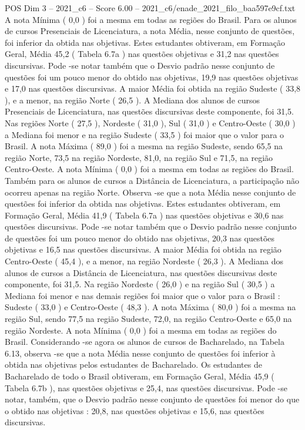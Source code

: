\begin{textsample}{POS Dim 3 – 2021\_c6 – Score 6.00 – 2021\_c6/enade\_2021\_filo\_baa597e9cf.txt}
A nota Mínima ( 0,0 ) foi a mesma em todas as regiões do Brasil.
Para os alunos de cursos Presenciais de Licenciatura, a nota Média, nesse conjunto de questões, foi inferior da obtida nas objetivas.
Estes estudantes obtiveram, em Formação Geral, Média 45,2 ( Tabela 6.7a ) nas questões objetivas e 31,2 nas questões discursivas.
Pode -se notar também que o Desvio padrão nesse conjunto de questões foi um pouco menor do obtido nas objetivas, 19,9 nas questões objetivas e 17,0 nas questões discursivas.
A maior Média foi obtida na região Sudeste ( 33,8 ), e a menor, na região Norte ( 26,5 ).
A Mediana dos alunos de cursos Presenciais de Licenciatura, nas questões discursivas deste componente, foi 31,5.
Nas regiões Norte ( 27,5 ), Nordeste ( 31,0 ), Sul ( 31,0 ) e Centro-Oeste ( 30,0 ) a Mediana foi menor e na região Sudeste ( 33,5 ) foi maior que o valor para o Brasil.
A nota Máxima ( 89,0 ) foi a mesma na região Sudeste, sendo 65,5 na região Norte, 73,5 na região Nordeste, 81,0, na região Sul e 71,5, na região Centro-Oeste.
A nota Mínima ( 0,0 ) foi a mesma em todas as regiões do Brasil.
Também para os alunos de cursos a Distância de Licenciatura, a participação não ocorreu apenas na região Norte.
Observa -se que a nota Média nesse conjunto de questões foi inferior da obtida nas objetivas.
Estes estudantes obtiveram, em Formação Geral, Média 41,9 ( Tabela 6.7a ) nas questões objetivas e 30,6 nas questões discursivas.
Pode -se notar também que o Desvio padrão nesse conjunto de questões foi um pouco menor do obtido nas objetivas, 20,3 nas questões objetivas e 16,5 nas questões discursivas.
A maior Média foi obtida na região Centro-Oeste ( 45,4 ), e a menor, na região Nordeste ( 26,3 ).
A Mediana dos alunos de cursos a Distância de Licenciatura, nas questões discursivas deste componente, foi 31,5.
Na região Nordeste ( 26,0 ) e na região Sul ( 30,5 ) a Mediana foi menor e nas demais regiões foi maior que o valor para o Brasil : Sudeste ( 33,0 ) e Centro-Oeste ( 48,3 ).
A nota Máxima ( 80,0 ) foi a mesma na região Sul, sendo 77,5 na região Sudeste, 72,0, na região Centro-Oeste e 65,0 na região Nordeste.
A nota Mínima ( 0,0 ) foi a mesma em todas as regiões do Brasil.
Considerando -se agora os alunos de cursos de Bacharelado, na Tabela 6.13, observa -se que a nota Média nesse conjunto de questões foi inferior à obtida nas objetivas pelos estudantes de Bacharelado.
Os estudantes de Bacharelado de todo o Brasil obtiveram, em Formação Geral, Média 45,9 ( Tabela 6.7b ), nas questões objetivas e 25,4, nas questões discursivas.
Pode -se notar, também, que o Desvio padrão nesse conjunto de questões foi menor do que o obtido nas objetivas : 20,8, nas questões objetivas e 15,6, nas questões discursivas.

\end{textsample}

